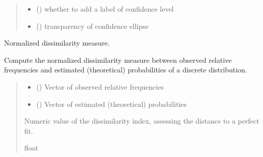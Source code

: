 \documentclass[letterpaper,10pt,english]{sphinxmanual}
\begin{document}
\begin{fulllineitems}
\begin{quote}
\begin{description}
\begin{itemize}
\item {} 
\sphinxAtStartPar
{} () \textendash{} whether to add a label of confidence level

\item {} 
\sphinxAtStartPar
{} () \textendash{} transparency of confidence ellipse

\end{itemize}

\end{description}\end{quote}

\end{fulllineitems}


\begin{fulllineitems}
\label{\detokenize{cubmods:cubmods.general.dissimilarity}}
\pysigstartsignatures
{}
\pysigstopsignatures
\sphinxAtStartPar
Normalized dissimilarity measure.

\sphinxAtStartPar
Compute the normalized dissimilarity measure between observed
relative frequencies and estimated (theoretical) probabilities of a discrete distribution.
\begin{quote}\begin{description}
\begin{itemize}
\item {} 
\sphinxAtStartPar
{} () \textendash{} Vector of observed relative frequencies

\item {} 
\sphinxAtStartPar
{} () \textendash{} Vector of estimated (theoretical) probabilities

\end{itemize}

\sphinxAtStartPar
Numeric value of the dissimilarity index, assessing the distance to a perfect fit.

\sphinxAtStartPar
float

\end{description}\end{quote}

\end{fulllineitems}
\end{document}
